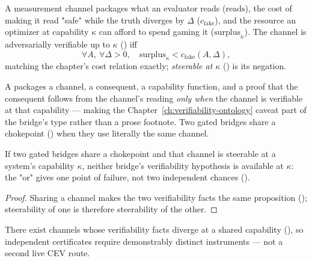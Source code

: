 \begin{definition}
\label{appi:def:adv-verifiable}
A measurement channel packages what an evaluator reads (\(\mathrm{reads}\)), the cost of making it read "safe" while the truth diverges by \(\Delta\) (\(c_{\mathrm{fake}}\)), and the resource an optimizer at capability \(\kappa\) can afford to spend gaming it (\(\mathrm{surplus}_\kappa\)). The channel is adversarially verifiable up to \(\kappa\) () iff
\begin{equation}
\label{appi:eq:adv-verif-def}
\forall A,\ \forall \Delta>0,\quad \mathrm{surplus}_\kappa < c_{\mathrm{fake}}(A,\Delta),
\end{equation}
matching the chapter's cost relation exactly; \emph{steerable at \(\kappa\)} () is its negation.
\end{definition}

\begin{definition}
\label{appi:def:gated-bridge}
A  packages a channel, a consequent, a capability function, and a proof that the consequent follows from the channel's reading \emph{only when} the channel is verifiable at that capability --- making the Chapter~\ref{ch:verifiability-ontology} caveat part of the bridge's type rather than a prose footnote. Two gated bridges share a chokepoint () when they use literally the same channel.
\end{definition}

\begin{theorem}
\label{appi:thm:chokepoint-collapse}
If two gated bridges share a chokepoint and that channel is steerable at a system's capability \(\kappa\), neither bridge's verifiability hypothesis is available at \(\kappa\): the "or" gives one point of failure, not two independent chances ().
\end{theorem}
\begin{proof}
Sharing a channel makes the two verifiability facts the same proposition (); steerability of one is therefore steerability of the other.
\end{proof}

\begin{corollary}
\label{appi:cor:chokepoint-independent}
There exist channels whose verifiability facts diverge at a shared capability (), so independent certificates require demonstrably distinct instruments --- not a second live CEV route.
\end{corollary}

